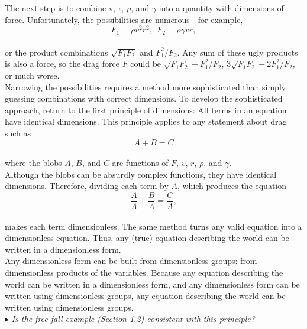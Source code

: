 \documentclass[a4paper]{book}
\begin{document}
\noindent The next step is to combine v, r, $\rho$, and $\gamma$ into a quantity with dimensions
of force. Unfortunately, the possibilities are numerous---for example,\\
\begin{equation}
F_1 = \rho v^2r^2,~~
F_2 = \rho \gamma vr,
\end{equation}\\
or the product combinations $\sqrt{F_1F_2}$ and $F_1^2/F_2$. Any sum of these ugly products is also a force, so the drag force $F$ could be $\sqrt{F_1F_2}  + F_1^2/F_2$, 3$\sqrt{F_1F_2} - 2F_1^2/F_2$, or much worse.\\
\newpage
\noindent Narrowing the possibilities requires a method more sophisticated than simply guessing combinations with correct dimensions. To develop the sophisticated approach, return to the first principle of dimensions: All terms in an equation have identical dimensions. This principle applies to any statement about drag such as\\
\begin{equation}
A + B = C
\end{equation}\\
where the blobs $A$, $B$, and $C$ are functions of $F$, $v$, $r$, $\rho$, and $\gamma$.\\

\noindent Although the blobs can be absurdly complex functions, they have identical dimensions. Therefore, dividing each term by $A$, which produces the equation\\
\begin{equation}
\frac{A}{A} +\frac{B}{A} = \frac{C}{A} ,
\end{equation}\\

\noindent makes each term dimensionless. The same method turns any valid equation into a dimensionless equation. Thus, any (true) equation describing the world can be written in a dimensionless form.\\

\noindent Any dimensionless form can be built from dimensionless groups: from dimension\-less products of the variables. Because any equation describing the world can be written in a dimensionless form, and any dimensionless form can be written using dimensionless groups, any equation describing the world can be written using dimensionless groups.\\

\noindent $\blacktriangleright$ {\it Is the free-fall example (Section 1.2) consistent with this principle?}\\ 
\end{document}
